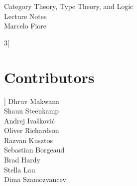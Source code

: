 \setlength\parindent{0pt}
\setlength\parskip{0.7em}

\newcommand {\cat}{%
    \mathbf%
}
\newcommand {\domain}[1] {%
    \mathrm{dom}(#1)%
}
\newcommand {\codomain}[1] {%
    \mathrm{cod}(#1)%
}
\newcommand {\idarrow}[1][] {%
    \mathbf{1}{#1}%
}
\newcommand{\catcat}{\cat {Cat}}
\newcommand{\catmon}{\cat {Mon}}
\newcommand{\catposet}{\cat {Poset}}
\newcommand{\catrel}{\cat {Rel}}
\newcommand{\catset}{\cat {Set}}
\newcommand{\catpfn}{\cat {Pfn}}
\newcommand{\catfinset}{\cat {FinSet}}
\newcommand{\catbij}{\cat {Bij}}
\newcommand{\catgroup}{\cat {Groups}}
\newcommand{\catgraph}{\cat {Graphs}}
\newcommand{\catpreo}{\cat {PreO}}
\newcommand{\catpred}{\cat {Pred}}
\newcommand{\catdirgraph}{\cat {DirGraph}}

\DeclareMathOperator{\Ob}{\mathit{Obj}}
\DeclareMathOperator{\Arr}{\mathit{Arr}}

\newcommand{\ie}{\emph{i.e.}}
\newcommand{\etc}{\emph{etc.}}

\newcommand{\eqdef}{\stackrel{\text{def}}{=}} %
\newcommand{\comp}{\circ} %
\newcommand{\icomp}{\,} %

\newcommand{\setof}[1]{ \{ #1 \} }
\newcommand{\bigsetof}[1]{ \big\{ #1 \big\} }
\newcommand{\suchthat}{\mid}
\newcommand{\union}{\cup}
\newcommand{\unitset}{\mathbf 1}

\newcommand{\nelem}[1]{ \mathbf{ #1 } }
\newcommand{\id}[1]{ \mathrm{id}_{ #1 } }
\newcommand{\idfunc}{ \mathrm{Id} }
\newcommand{\nats}{\mathbb{N}}
\newcommand{\morpharrow}{\longrightarrow}
\newcommand{\morpharr}[1]{\overset{#1}{\morpharrow}}



\begin{center} {\LARGE \sc
Category Theory, Type Theory, and Logic\\
  Lecture Notes\\[4mm]}
  \Large Marcelo Fiore
\end{center}


\thispagestyle{plain}
\begin{multicols}{3}[\section*{Contributors}]
Dhruv Makwana\\
Shaun Steenkamp\\
Andrej Ivašković\\
Oliver Richardson\\
Razvan Kusztos\\
Sebastian Borgeaud\\
Brad Hardy\\
Stella Lau\\
Dima Szamozvancev
\end{multicols}
\clearpage


